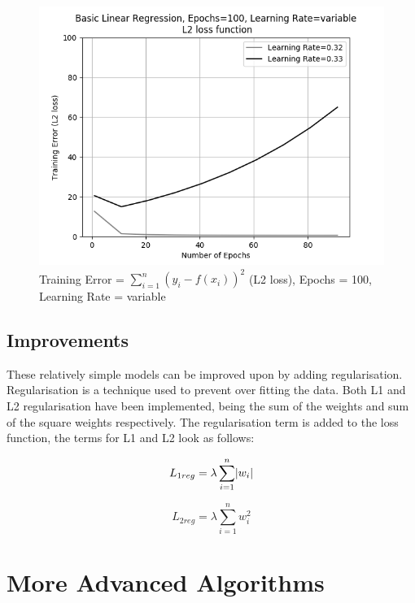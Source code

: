 \documentclass[10pt,twocolumn,letterpaper]{article}
\DeclarePairedDelimiter\abs{\lvert}{\rvert}%
\begin{document}
\begin{figure}[h]
	\begin{center}
		\includegraphics[width=0.9\linewidth]{img/linrbreak.png}
	\end{center}
	\caption{Training Error = $\sum_{i = 1}^{n} (y_i - f(x_i))^2$ (L2 loss), Epochs = 100, Learning Rate = variable}
	\label{fig:break}
\end{figure}

\subsection{Improvements}
These relatively simple models can be improved upon by adding regularisation. Regularisation is a technique used to prevent over fitting the data. Both L1 and L2 regularisation have been implemented, being the sum of the weights and sum of the square weights respectively. The regularisation term is added to the loss function, the terms for L1 and L2 look as follows:

\noindent\begin{minipage}{.5\linewidth}
	\begin{equation}
	L_{1reg} = \lambda \sum_{i = 1}^{n} \abs{w_i}
	\end{equation}
\end{minipage}%
\begin{minipage}{.5\linewidth}
	\begin{equation}
	L_{2reg} = \lambda \sum_{i = 1}^{n} w_i^2
	\end{equation}
\end{minipage}

\section{More Advanced Algorithms}
\end{document}
